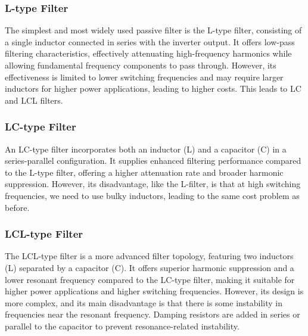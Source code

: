\documentclass[12pt,a4paper]{book}
\begin{document}
\subsubsection{L-type Filter}
The simplest and most widely used passive filter is the L-type filter, consisting of a single inductor connected in series with the inverter output. It offers low-pass filtering characteristics, effectively attenuating high-frequency harmonics while allowing fundamental frequency components to pass through. However, its effectiveness is limited to lower switching frequencies and may require larger inductors for higher power applications, leading to higher costs. This leads to LC and LCL filters.

\subsubsection{LC-type Filter}
An LC-type filter incorporates both an inductor (L) and a capacitor (C) in a series-parallel configuration. It supplies enhanced filtering performance compared to the L-type filter, offering a higher attenuation rate and broader harmonic suppression. However, its disadvantage, like the L-filter, is that at high switching frequencies, we need to use bulky inductors, leading to the same cost problem as before.

\subsubsection{LCL-type Filter}
The LCL-type filter is a more advanced filter topology, featuring two inductors (L) separated by a capacitor (C). It offers superior harmonic suppression and a lower resonant frequency compared to the LC-type filter, making it suitable for higher power applications and higher switching frequencies. However, its design is more complex, and its main disadvantage is that there is some instability in frequencies near the resonant frequency. Damping resistors are added in series or parallel to the capacitor to prevent resonance-related instability.
\end{document}
